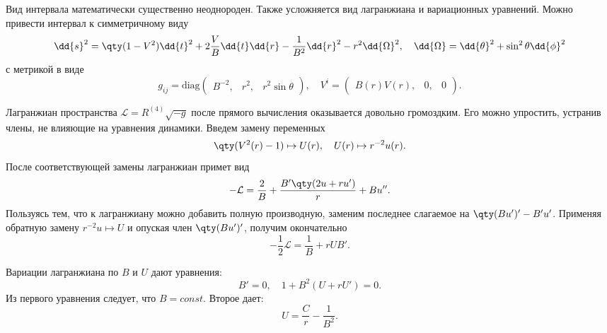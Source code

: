 \documentclass[\docroot/reports/draft/report.tex]{subfiles}
\begin{document}
    Вид интервала математически существенно неоднороден. Также усложняется вид лагранжиана и вариационных уравнений. Можно привести интервал к симметричному виду
    \begin{equation*}
        \dd{s}^2 = \qty(1 - V^2) \dd{t}^2 + 2 \frac{V}{B} \dd{t} \dd{r} - \frac{1}{B^2} \dd{r}^2 - r^2 \dd{\Omega}^2 , \quad \dd{\Omega} = \dd{\theta}^2 + \sin^2{\theta} \dd{\phi}^2
    \end{equation*}
    с метрикой в виде
    \begin{equation*}
        g_{ij} = \text{diag} \begin{pmatrix}B^{-2}, & r^2, & r^2 \sin\theta\end{pmatrix} , \quad
        V^i = \begin{pmatrix}B(r)V(r), & 0, & 0\end{pmatrix} .
    \end{equation*}

    Лагранжиан пространства $\mathcal{L} = R^{(4)} \sqrt{-g}$ после прямого вычисления оказывается довольно громоздким. Его можно упростить, устранив члены, не влияющие на уравнения динамики. Введем замену переменных
    \begin{equation*}
        \qty(V^2(r) - 1) \mapsto U(r) , \quad U(r) \mapsto r^{-2} u(r) .
    \end{equation*}
    После соответствующей замены лагранжиан примет вид
    \begin{equation*}
        - \mathcal{L} = \frac{2}{B} + \frac{B' \qty(2 u + r u')}{r} + B u'' .
    \end{equation*}
    Пользуясь тем, что к лагранжиану можно добавить полную производную, заменим последнее слагаемое на $\qty(B u')' - B'u'$. Применяя обратную замену $r^{-2} u \mapsto U$ и опуская член $\qty(B u')'$, получим окончательно
    \begin{equation*}
        - \frac{1}{2} \mathcal{L} = \frac{1}{B} + r U B' .
    \end{equation*}

    Вариации лагранжиана по $B$ и $U$ дают уравнения:
    \begin{equation*}
        B' = 0 , \quad 1 + B^2 (U + r U') = 0 .
    \end{equation*}
    Из первого уравнения следует, что $B = const$. Второе дает:
    \begin{equation*}
        U = \frac{C}{r} - \frac{1}{B^2} .
    \end{equation*}
\end{document}
